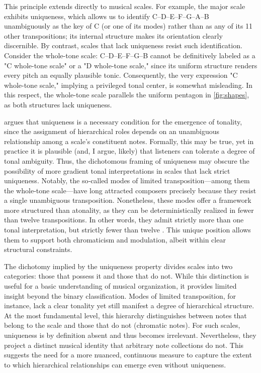 \documentclass[10pt,twocolumn]{article}
\numberwithin{equation}{section} %
\begin{document}
    This principle extends directly to musical scales.
    For example, the major scale exhibits uniqueness, which allows us to identify C–D–E–F–G–A–B unambiguously as the key of C (or one of its modes) rather than as any of its 11 other transpositions; its internal structure makes its orientation clearly discernible.
    By contrast, scales that lack uniqueness resist such identification.
    Consider the whole-tone scale: C–D–E–F\text{$\sharp$}–G\text{$\sharp$}–B\text{$\flat$} cannot be definitively labeled as a "C whole-tone scale" or a "D whole-tone scale," since its uniform structure renders every pitch an equally plausible tonic.
    Consequently, the very expression "C whole-tone scale," implying a privileged tonal center, is somewhat misleading.
    In this respect, the whole-tone scale parallels the uniform pentagon in \autoref{fig:shapes}, as both structures lack uniqueness.

    \citet{Balzano1982} argues that uniqueness is a necessary condition for the emergence of tonality, since the assignment of hierarchical roles depends on an unambiguous relationship among a scale's constituent notes.
    Formally, this may be true, yet in practice it is plausible (and, I argue, likely) that listeners can tolerate a degree of tonal ambiguity.
    Thus, the dichotomous framing of uniqueness may obscure the possibility of more gradient tonal interpretations in scales that lack strict uniqueness.
    Notably, the so‑called modes of limited transposition—among them the whole‑tone scale—have long attracted composers precisely because they resist a single unambiguous transposition.
    Nonetheless, these modes offer a framework more structured than atonality, as they can be deterministically realized in fewer than twelve transpositions.
    In other words, they admit strictly more than one tonal interpretation, but strictly fewer than twelve \citep{Messiaen1944}.
    This unique position allows them to support both chromaticism and modulation, albeit within clear structural constraints.

    The dichotomy implied by the uniqueness property divides scales into two categories: those that possess it and those that do not.
    While this distinction is useful for a basic understanding of musical organization, it provides limited insight beyond the binary classification.
    Modes of limited transposition, for instance, lack a clear tonality yet still manifest a degree of hierarchical structure.
    At the most fundamental level, this hierarchy distinguishes between notes that belong to the scale and those that do not (chromatic notes).
    For such scales, uniqueness is by definition absent and thus becomes irrelevant.
    Nevertheless, they project a distinct musical identity that arbitrary note collections do not.
    This suggests the need for a more nuanced, continuous measure to capture the extent to which hierarchical relationships can emerge even without uniqueness.
\end{document}
